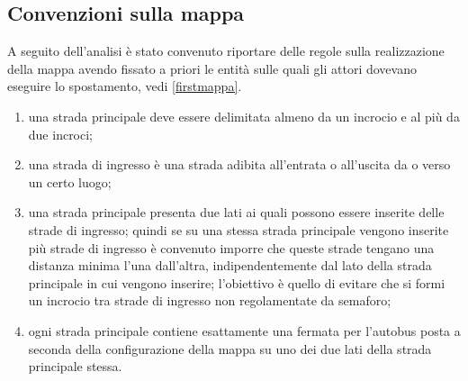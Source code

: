 \subsection{Convenzioni sulla mappa}
A seguito dell'analisi è stato convenuto riportare delle regole sulla
realizzazione della mappa avendo fissato a priori le entità sulle quali gli
attori dovevano eseguire lo spostamento, vedi \ref{firstmappa}.
\begin{enumerate}
\item una strada principale deve essere delimitata almeno da un incrocio e al
più da due incroci;
\item una strada di ingresso è una strada adibita all'entrata o all'uscita da o
verso un certo luogo;
\item una strada principale presenta due lati ai quali possono essere inserite
delle strade di ingresso; quindi se su una stessa strada principale vengono
inserite più strade di ingresso è convenuto imporre che queste strade tengano
una distanza minima l'una dall'altra, indipendentemente dal lato della strada
principale in cui vengono inserire; l'obiettivo è quello di evitare che si
formi un incrocio tra strade di ingresso non regolamentate da semaforo;
\item ogni strada principale contiene esattamente una fermata per l'autobus
posta a seconda della configurazione della mappa su uno dei due lati della
strada principale stessa.
\end{enumerate}

